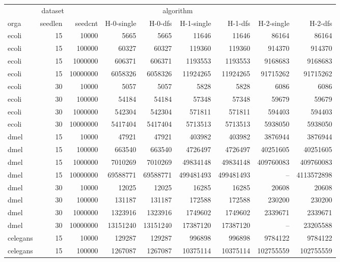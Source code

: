 \begin{tabular}{lrrrrrrrr}
  \toprule
\multicolumn{3}{c}{dataset} &\multicolumn{4}{c}{algorithm}\\
\cmidrule{1-3} \cmidrule{4-7}orga & seedlen & seedcnt & H-0-single & H-0-dfs & H-1-single & H-1-dfs & H-2-single & H-2-dfs \\ 
  \midrule ecoli & 15 & 10000 & 5665 & 5665 & 11646 & 11646 & 86164 & 86164 \\ 
  ecoli & 15 & 100000 & 60327 & 60327 & 119360 & 119360 & 914370 & 914370 \\ 
  ecoli & 15 & 1000000 & 606371 & 606371 & 1193553 & 1193553 & 9168683 & 9168683 \\ 
  ecoli & 15 & 10000000 & 6058326 & 6058326 & 11924265 & 11924265 & 91715262 & 91715262 \\ 
  ecoli & 30 & 10000 & 5057 & 5057 & 5828 & 5828 & 6086 & 6086 \\ 
  ecoli & 30 & 100000 & 54184 & 54184 & 57348 & 57348 & 59679 & 59679 \\ 
  ecoli & 30 & 1000000 & 542304 & 542304 & 571811 & 571811 & 594403 & 594403 \\ 
  ecoli & 30 & 10000000 & 5417404 & 5417404 & 5713513 & 5713513 & 5938050 & 5938050 \\ 
  dmel & 15 & 10000 & 47921 & 47921 & 403982 & 403982 & 3876944 & 3876944 \\ 
  dmel & 15 & 100000 & 663540 & 663540 & 4726497 & 4726497 & 40251605 & 40251605 \\ 
  dmel & 15 & 1000000 & 7010269 & 7010269 & 49834148 & 49834148 & 409760083 & 409760083 \\ 
  dmel & 15 & 10000000 & 69588771 & 69588771 & 499481493 & 499481493 & -- & 4113572898 \\ 
  dmel & 30 & 10000 & 12025 & 12025 & 16285 & 16285 & 20608 & 20608 \\ 
  dmel & 30 & 100000 & 131187 & 131187 & 172588 & 172588 & 230200 & 230200 \\ 
  dmel & 30 & 1000000 & 1323916 & 1323916 & 1749602 & 1749602 & 2339671 & 2339671 \\ 
  dmel & 30 & 10000000 & 13151240 & 13151240 & 17387120 & 17387120 & -- & 23205588 \\ 
  celegans & 15 & 10000 & 129287 & 129287 & 996898 & 996898 & 9784122 & 9784122 \\ 
  celegans & 15 & 100000 & 1267087 & 1267087 & 10375114 & 10375114 & 102755559 & 102755559 \\ 

\end{tabular}
